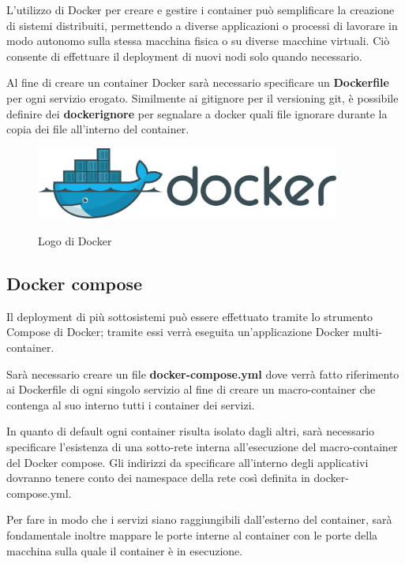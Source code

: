 \noindent L'utilizzo di Docker per creare e gestire i container può semplificare la creazione di sistemi distribuiti, permettendo a diverse applicazioni o processi di lavorare in modo autonomo sulla stessa macchina fisica o su diverse macchine virtuali. Ciò consente di effettuare il deployment di nuovi nodi solo quando necessario.\newline

\noindent Al fine di creare un container Docker sarà necessario specificare un \textbf{Dockerfile} per ogni servizio erogato. 
Similmente ai gitignore per il versioning git, è possibile definire dei \textbf{dockerignore} per segnalare a docker quali file ignorare durante la copia dei file all'interno del container.

\begin{figure}[H]
    \caption{Logo di Docker}
    \centering
    \includegraphics[width= 100mm]{img/logos/docker_logo.png}
    \label{fig:docker_logo}
\end{figure}

\subsection{Docker compose}
Il deployment di più sottosistemi può essere effettuato tramite lo strumento Compose di Docker; tramite essi verrà eseguita un'applicazione Docker multi-container.\newline

\noindent Sarà necessario creare un file \textbf{docker-compose.yml} dove verrà fatto riferimento ai Dockerfile di ogni singolo servizio al fine di creare un macro-container che contenga al suo interno tutti i container dei servizi.\newline

\noindent In quanto di default ogni container risulta isolato dagli altri, sarà necessario specificare l'esistenza di una sotto-rete interna all'esecuzione del macro-container del Docker compose. Gli indirizzi da specificare all'interno degli applicativi dovranno tenere conto dei namespace della rete così definita in docker-compose.yml.\newline

\noindent Per fare in modo che i servizi siano raggiungibili dall'esterno del container, sarà fondamentale inoltre mappare le porte interne al container con le porte della macchina sulla quale il container è in esecuzione.

